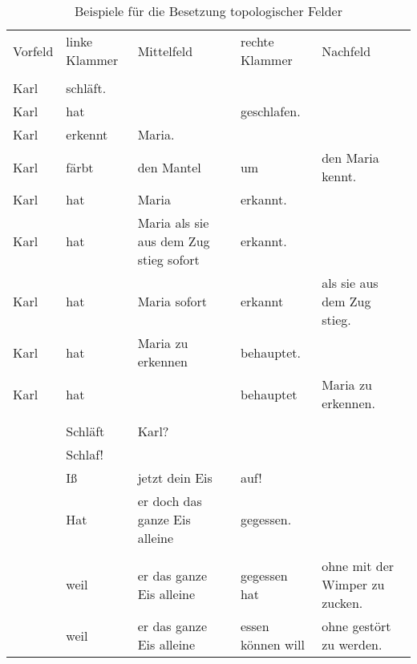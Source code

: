 \begin{table}[htbp]
\begin{sideways}
\begin{tabular}{lllll}
Vorfeld & linke Klammer & Mittelfeld                             & rechte Klammer & Nachfeld                   \\ \\
Karl    & schläft.                                                                                            \\
Karl    & hat           &                                        & geschlafen.                                 \\
Karl    & erkennt       & Maria.                                                                               \\
Karl    & färbt         & den Mantel                             & um             & den Maria kennt.           \\
Karl    & hat           & Maria                                  & erkannt.                                    \\
Karl    & hat           & Maria als sie aus dem Zug stieg sofort & erkannt.                                    \\
Karl    & hat           & Maria sofort                           & erkannt        & als sie aus dem Zug stieg. \\
Karl    & hat           & Maria zu erkennen                      & behauptet.                                  \\
Karl    & hat           &                                        & behauptet      & Maria zu erkennen.         \\ \\
        & Schläft       & Karl?                                                                                \\
        & Schlaf!                                                                                              \\
        & Iß            & jetzt dein Eis                         & auf!                                        \\
        & Hat           & er doch das ganze Eis alleine          & gegessen.                                   \\  \\
        & weil          & er das ganze Eis alleine               & gegessen hat   & ohne mit der Wimper zu zucken.    \\
        & weil          & er das ganze Eis alleine               & essen können will   & ohne gestört zu werden.    \\
\end{tabular}
\end{sideways}
\caption{\label{bsp-topo}Beispiele für die Besetzung topologischer Felder}
\end{table}

